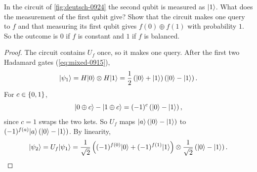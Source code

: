 \begin{exercisebox}
\begin{exercise}\label{ex:deutsch-0924}\label{thm:deutsch-0924}
    In the circuit of \cref{fig:deutsch-0924} the second qubit is measured as $\lvert 1 \rangle$. What does
    the measurement of the first qubit give? Show that the circuit makes one query to $f$ and that
    measuring its first qubit gives $f(0) \oplus f(1)$ with probability $1$. So the outcome is $0$
    if $f$ is constant and $1$ if $f$ is balanced.
\end{exercise}
\tcblower
\begin{proof}
    The circuit contains $U_f$ once, so it makes one query. After the first two Hadamard gates
    (\cref{eq:mixed-0915}),
    \[\lvert \psi_1 \rangle = H\lvert 0 \rangle \otimes H\lvert 1 \rangle
        = \frac{1}{2}\left(\lvert 0 \rangle + \lvert 1 \rangle\right)\left(\lvert 0 \rangle - \lvert 1 \rangle\right).\]
    For $c \in \left\lbrace0,1\right\rbrace$,
    \[\lvert 0 \oplus c \rangle - \lvert 1 \oplus c \rangle = (-1)^{c}\left(\lvert 0 \rangle - \lvert 1 \rangle\right),\]
    since $c = 1$ swaps the two kets. So $U_f$ maps $\lvert a \rangle\left(\lvert 0 \rangle - \lvert 1 \rangle\right)$ to
    $(-1)^{f(a)} \lvert a \rangle\left(\lvert 0 \rangle - \lvert 1 \rangle\right)$. By linearity,
    \[\lvert \psi_2 \rangle = U_f \lvert \psi_1 \rangle
        = \frac{1}{\sqrt{2}}\left((-1)^{f(0)}\lvert 0 \rangle + (-1)^{f(1)}\lvert 1 \rangle\right)
        \otimes \frac{1}{\sqrt{2}}\left(\lvert 0 \rangle - \lvert 1 \rangle\right).\]


\end{proof}
\end{exercisebox}
